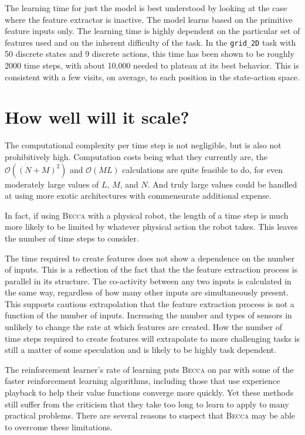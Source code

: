 The learning time for just the model is best understood by looking at the case where the feature extractor is inactive. The model learns based on the primitive feature inputs only. The learning time is highly dependent on the particular set of features used and on the inherent difficulty of the task. In the \texttt{grid\_2D} task with 50 discrete states and 9 discrete actions, this time has been shown to be roughly 2000 time steps, with about 10,000 needed to plateau at its best behavior. This is consistent with a few visits, on average, to each position in the state-action space.

\section{How well will it scale?}

The computational complexity per time step is not negligible, but is also not prohibitively high. Computation costs being what they currently are, the $\mathcal{O}((N+M)^2)$ and  $\mathcal{O}(ML)$ calculations are quite feasible to do, for even moderately large values of $L$, $M$, and $N$. And truly large values could be handled at using more exotic architectures with commensurate additional expense. 

In fact, if using \textsc{Becca} with a physical robot, the length of a time step is much more likely to be limited by whatever physical action the robot takes. This leaves the number of time steps  to consider.

The time required to create features does not show a dependence on the number of inputs. This is a reflection of the fact that the the feature extraction process is parallel in its structure. The co-activity between any two inputs is calculated in the same way, regardless of how many other inputs are simultaneously present. This supports cautious extrapolation that the feature extraction process is not a function of the number of inputs. Increasing the number and types of sensors in unlikely to change the rate at which features are created. How the number of time steps required to create features will extrapolate to more challenging tasks is still a matter of some speculation and is likely to be highly task dependent.

The reinforcement learner's rate of learning puts \textsc{Becca} on par with some of the faster reinforcement learning algorithms, including those that use experience playback to help their value functions converge more quickly. Yet these methods still suffer from the criticism that they take too long to learn to apply to many practical problems. There are several reasons to suspect that \textsc{Becca} may be able to overcome these limitations.

